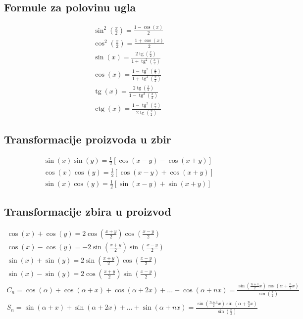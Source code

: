 \documentclass[a4paper,12pt,twoside]{report}
\numberwithin{algorithm}{section}
\renewcommand{\tan}{\operatorname{tg}}
\renewcommand{\cot}{\operatorname{ctg}}
\begin{document}
\subsection{Formule za polovinu ugla}
\[
\begin{aligned}
    \sin^2\left(\frac{x}{2}\right) = \frac{1 - \cos(x)}{2} \\
    \cos^2\left(\frac{x}{2}\right) = \frac{1 + \cos(x)}{2} \\
    \sin(x) = \frac{2\tan\left(\frac{x}{2}\right)}{1 + \tan^2\left(\frac{x}{2}\right)}\\
    \cos(x) = \frac{1 - \tan^2\left(\frac{x}{2}\right)}{1 + \tan^2\left(\frac{x}{2}\right)}\\
    \tan(x) = \frac{2\tan\left(\frac{x}{2}\right)}{1 - \tan^2\left(\frac{x}{2}\right)}\\
    \cot(x) = \frac{1 - \tan^2\left(\frac{x}{2}\right)}{2\tan\left(\frac{x}{2}\right)}
\end{aligned}
\]

\subsection{Transformacije proizvoda u zbir}
\[
\begin{aligned}
    \sin(x)\sin(y) = \frac{1}{2}[\cos(x-y) - \cos(x+y)]\\
    \cos(x)\cos(y) = \frac{1}{2}[\cos(x-y) + \cos(x+y)]\\
    \sin(x)\cos(y) = \frac{1}{2}[\sin(x-y) + \sin(x+y)]
\end{aligned}
\]

\subsection{Transformacije zbira u proizvod}
\[
\begin{aligned}
    \cos(x) + \cos(y) = 2\cos\left(\frac{x+y}{2}\right)\cos\left(\frac{x-y}{2}\right)\\
    \cos(x) - \cos(y) = -2\sin\left(\frac{x+y}{2}\right)\sin\left(\frac{x-y}{2}\right)\\
    \sin(x) + \sin(y) = 2\sin\left(\frac{x+y}{2}\right)\cos\left(\frac{x-y}{2}\right)\\
    \sin(x) - \sin(y) = 2\cos\left(\frac{x+y}{2}\right)\sin\left(\frac{x-y}{2}\right)\\
    C_{n} = \cos(\alpha) + \cos(\alpha + x)+\cos(\alpha + 2x)+...+\cos(\alpha + nx) = \frac{\sin(\frac{n+1}{2}x)\cos(\alpha + \frac{n}{2}x)}{\sin(\frac{x}{2})}\\
    S_{n} = \sin(\alpha + x)+\sin(\alpha + 2x)+...+\sin(\alpha + nx) = \frac{\sin(\frac{n+1}{2}x)\sin(\alpha + \frac{n}{2}x)}{\sin(\frac{x}{2})}
\end{aligned}
\]
\end{document}
